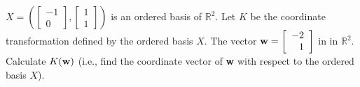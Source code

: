 \documentclass[10pt]{exam}
\begin{document}
\begin{questions}
\question $X = \left( \left[ \begin{array}{r} -1 \\ 0   \end{array} \right], \left[ \begin{array}{r} 1 \\  1 \end{array} \right] \right)$ is an ordered basis of $\mathbb{R}^2$.  Let $K$ be the coordinate transformation defined by the ordered basis $X$.  The vector ${\bf w} = \left[ \begin{array}{r} -2 \\ 1   \end{array} \right]$ in in $\mathbb{R}^2$.  Calculate $K({\bf w})$ (i.e., find the coordinate vector of {\bf w} with respect to the ordered basis $X$).

\vfill

\end{questions}
\end{document}

